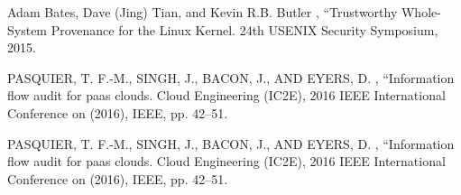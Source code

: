 \documentclass{IEEEtran}
\begin{document}
\begin{thebibliography}{00}
 Adam Bates, Dave (Jing) Tian, and Kevin R.B. Butler , ``Trustworthy Whole-System Provenance
for the Linux Kernel.
24th USENIX Security Symposium, 2015.








 PASQUIER, T. F.-M., SINGH, J., BACON, J., AND EYERS, D. , ``Information flow audit for paas clouds.
Cloud Engineering
(IC2E), 2016 IEEE International Conference on (2016), IEEE,
pp. 42–51.


 PASQUIER, T. F.-M., SINGH, J., BACON, J., AND EYERS, D. , ``Information flow audit for paas clouds.
Cloud Engineering
(IC2E), 2016 IEEE International Conference on (2016), IEEE,
pp. 42–51.
\end{thebibliography}
\end{document}
